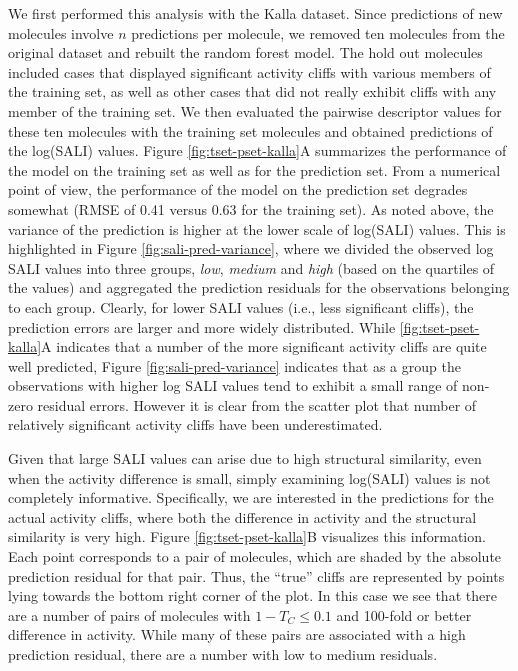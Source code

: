 \documentclass[letterpaper, 12pt]{article}
\begin{document}
We first performed this analysis with the Kalla dataset. Since predictions of new molecules involve
$n$ predictions per molecule, we removed ten molecules from the original dataset and rebuilt the
random forest model. The hold out molecules included cases that displayed significant activity
cliffs with various members of the training set, as well as other cases that did not really exhibit
cliffs with any member of the training set. We then evaluated the pairwise descriptor values for
these ten molecules with the training set molecules and obtained predictions of the log(SALI)
values. Figure \ref{fig:tset-pset-kalla}A summarizes the performance of the model on the training
set as well as for the prediction set. From a numerical point of view, the performance of the model
on the prediction set degrades somewhat (RMSE of 0.41 versus 0.63 for the training set). As noted
above, the variance of the prediction is higher at the lower scale of log(SALI) values. This is
highlighted in Figure \ref{fig:sali-pred-variance}, where we divided the observed log SALI values
into three groups, \emph{low}, \emph{medium} and \emph{high} (based on the quartiles of the values)
and aggregated the prediction residuals for the observations belonging to each group. Clearly, for
lower SALI values (i.e., less significant cliffs), the prediction errors are larger and more widely
distributed. While \ref{fig:tset-pset-kalla}A indicates that a number of the more significant
activity cliffs are quite well predicted, Figure \ref{fig:sali-pred-variance} indicates that as a
group the observations with higher log SALI values tend to exhibit a small range of non-zero
residual errors. However it is clear from the scatter plot that number of relatively significant
activity cliffs have been underestimated.

Given that large SALI values can arise due to high structural similarity, even when the activity
difference is small, simply examining log(SALI) values is not completely informative. Specifically,
we are interested in the predictions for the actual activity cliffs, where both the difference in
activity and the structural similarity is very high. Figure \ref{fig:tset-pset-kalla}B visualizes this
information. Each point corresponds to a pair of molecules, which are shaded by the absolute
prediction residual for that pair. Thus, the ``true'' cliffs are represented by points lying towards
the bottom right corner of the plot. In this case we see that there are a number of pairs of
molecules with $1 - T_C \leq 0.1$ and 100-fold or better difference in activity. While many of these
pairs are associated with a high prediction residual, there are a number with low to medium
residuals.
  
\end{document}
